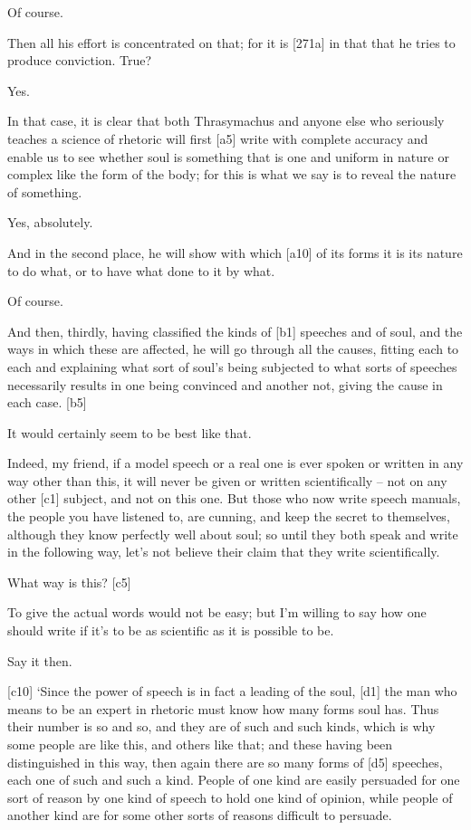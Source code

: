  Of course.

 Then all his effort is concentrated on that; for it is
{[}271a{]} in that that he tries to produce conviction. True?

 Yes.

 In that case, it is clear that both Thrasymachus and anyone
else who seriously teaches a science of rhetoric will first {[}a5{]}
write with complete accuracy and enable us to see whether soul is
something that is one and uniform in nature or complex like the form of
the body; for this is what we say is to reveal the nature of something.

 Yes, absolutely.

 And in the second place, he will show with which {[}a10{]} of
its forms it is its nature to do what, or to have what done to it by
what.

 Of course.

 And then, thirdly, having classified the
kinds of {[}b1{]}
speeches and of soul, and the ways in which these are affected, he will
go through all the causes, fitting each to each and explaining what sort
of soul's being subjected to what sorts of speeches necessarily results
in one being convinced and another not, giving the cause in each case.
{[}b5{]}

 It would certainly seem to be best like that.

 Indeed, my friend, if a model
speech or a real one is
ever spoken or written in any way other than this, it will never be
given or written scientifically -- not on any other {[}c1{]} subject,
and not on this one. But
those who now write speech manuals, the people you have listened to, are
cunning, and keep the secret to themselves, although they know perfectly
well about soul; so until they both speak and write in the following
way, let's not believe their claim that they write scientifically.

 What way is this? {[}c5{]}

 To give the actual words would not be easy; but I'm willing to
say how one should write
if it's to be as scientific as it is possible to be.

 Say it then.

{[}c10{]}  ‘Since the power of speech is in fact a leading of
the soul, {[}d1{]} the man who means to be an expert in rhetoric must
know how many forms soul has. Thus their number is so and so, and they
are of such and such kinds, which is why some people are like this, and
others like that; and these having been distinguished in this way, then
again there are so many forms of {[}d5{]} speeches, each one of such and
such a kind. People of one kind are easily persuaded for one sort of
reason by one kind of speech to hold one kind of opinion, while people
of another kind are for some other sorts of reasons difficult to
persuade.

